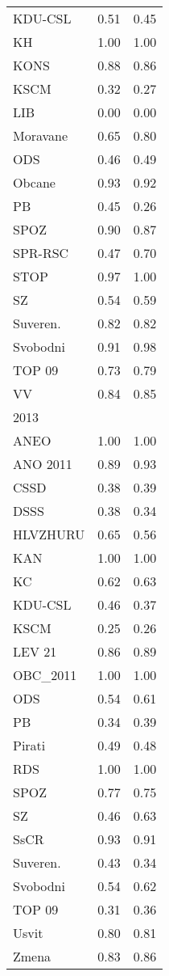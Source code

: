 \begin{tabular}{l|r|r}
KDU-CSL & 0.51 & 0.45\\
KH & 1.00 & 1.00\\
KONS & 0.88 & 0.86\\
KSCM & 0.32 & 0.27\\
LIB & 0.00 & 0.00\\
Moravane & 0.65 & 0.80\\
ODS & 0.46 & 0.49\\
Obcane & 0.93 & 0.92\\
PB & 0.45 & 0.26\\
SPOZ & 0.90 & 0.87\\
SPR-RSC & 0.47 & 0.70\\
STOP & 0.97 & 1.00\\
SZ & 0.54 & 0.59\\
Suveren. & 0.82 & 0.82\\
Svobodni & 0.91 & 0.98\\
TOP 09 & 0.73 & 0.79\\
VV & 0.84 & 0.85\\
\hline
\multicolumn{3}{l}{2013} \\
ANEO & 1.00 & 1.00\\
ANO 2011 & 0.89 & 0.93\\
CSSD & 0.38 & 0.39\\
DSSS & 0.38 & 0.34\\
HLVZHURU & 0.65 & 0.56\\
KAN & 1.00 & 1.00\\
KC & 0.62 & 0.63\\
KDU-CSL & 0.46 & 0.37\\
KSCM & 0.25 & 0.26\\
LEV 21 & 0.86 & 0.89\\
OBC\_2011 & 1.00 & 1.00\\
ODS & 0.54 & 0.61\\
PB & 0.34 & 0.39\\
Pirati & 0.49 & 0.48\\
RDS & 1.00 & 1.00\\
SPOZ & 0.77 & 0.75\\
SZ & 0.46 & 0.63\\
SsCR & 0.93 & 0.91\\
Suveren. & 0.43 & 0.34\\
Svobodni & 0.54 & 0.62\\
TOP 09 & 0.31 & 0.36\\
Usvit & 0.80 & 0.81\\
Zmena & 0.83 & 0.86\\
\hline
\end{tabular}
